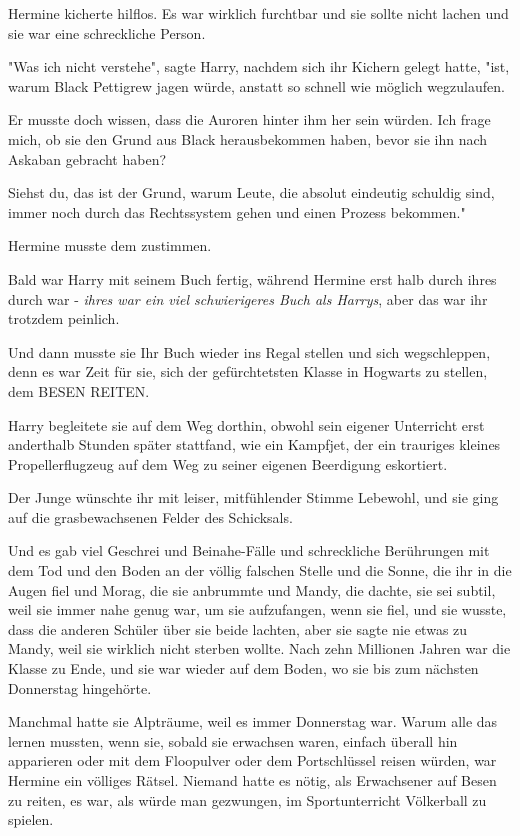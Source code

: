 {Hermine kicherte hilflos. Es war wirklich furchtbar und sie sollte nicht lachen und sie war eine schreckliche Person.

"Was ich nicht verstehe", sagte Harry, nachdem sich ihr Kichern gelegt hatte, "ist, warum Black Pettigrew jagen würde, anstatt so schnell wie möglich wegzulaufen.

Er musste doch wissen, dass die Auroren hinter ihm her sein würden. Ich frage mich, ob sie den Grund aus Black herausbekommen haben, bevor sie ihn nach Askaban gebracht haben?

Siehst du, das ist der Grund, warum Leute, die absolut eindeutig schuldig sind, immer noch durch das Rechtssystem gehen und einen Prozess bekommen."

Hermine musste dem zustimmen.

Bald war Harry mit seinem Buch fertig, während Hermine erst halb durch ihres durch war - \emph{ihres war ein viel schwierigeres Buch als Harrys}, aber das war ihr trotzdem peinlich.

Und dann musste sie Ihr Buch wieder ins Regal stellen und sich wegschleppen, denn es war Zeit für sie, sich der gefürchtetsten Klasse in Hogwarts zu stellen, dem BESEN REITEN.

Harry begleitete sie auf dem Weg dorthin, obwohl sein eigener Unterricht erst anderthalb Stunden später stattfand, wie ein Kampfjet, der ein trauriges kleines Propellerflugzeug auf dem Weg zu seiner eigenen Beerdigung eskortiert.

Der Junge wünschte ihr mit leiser, mitfühlender Stimme Lebewohl, und sie ging auf die grasbewachsenen Felder des Schicksals.

Und es gab viel Geschrei und Beinahe-Fälle und schreckliche Berührungen mit dem Tod und den Boden an der völlig falschen Stelle und die Sonne, die ihr in die Augen fiel und Morag, die sie anbrummte und Mandy, die dachte, sie sei subtil, weil sie immer nahe genug war, um sie aufzufangen, wenn sie fiel, und sie wusste, dass die anderen Schüler über sie beide lachten, aber sie sagte nie etwas zu Mandy, weil sie wirklich nicht sterben wollte. Nach zehn Millionen Jahren war die Klasse zu Ende, und sie war wieder auf dem Boden, wo sie bis zum nächsten Donnerstag hingehörte.

Manchmal hatte sie Alpträume, weil es immer Donnerstag war. Warum alle das lernen mussten, wenn sie, sobald sie erwachsen waren, einfach überall hin apparieren oder mit dem Floopulver oder dem Portschlüssel reisen würden, war Hermine ein völliges Rätsel. Niemand hatte es nötig, als Erwachsener auf Besen zu reiten, es war, als würde man gezwungen, im Sportunterricht Völkerball zu spielen.

}
